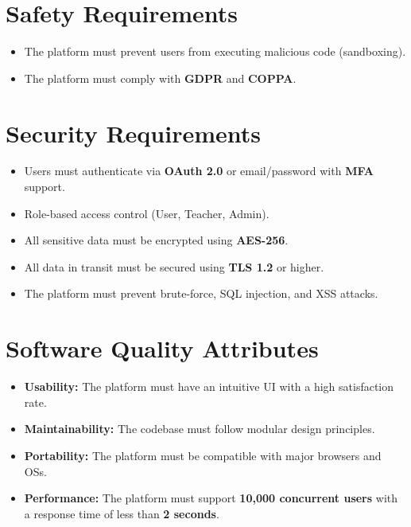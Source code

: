 \documentclass[a4paper, 11pt]{scrreprt}
\begin{document}
\section{Safety Requirements}
\begin{itemize}
    \item The platform must prevent users from executing malicious code (sandboxing).
    \item The platform must comply with \textbf{GDPR} and \textbf{COPPA}.
\end{itemize}

\section{Security Requirements}
\begin{itemize}
    \item Users must authenticate via \textbf{OAuth 2.0} or email/password with \textbf{MFA} support.
    \item Role-based access control (User, Teacher, Admin).
    \item All sensitive data must be encrypted using \textbf{AES-256}.
    \item All data in transit must be secured using \textbf{TLS 1.2} or higher.
    \item The platform must prevent brute-force, SQL injection, and XSS attacks.
\end{itemize}

\section{Software Quality Attributes}
\begin{itemize}
    \item \textbf{Usability:} The platform must have an intuitive UI with a high satisfaction rate.
    \item \textbf{Maintainability:} The codebase must follow modular design principles.
    \item \textbf{Portability:} The platform must be compatible with major browsers and OSs.
    \item \textbf{Performance:} The platform must support \textbf{10,000 concurrent users} with a response time of less than \textbf{2 seconds}.
\end{itemize}
\end{document}
